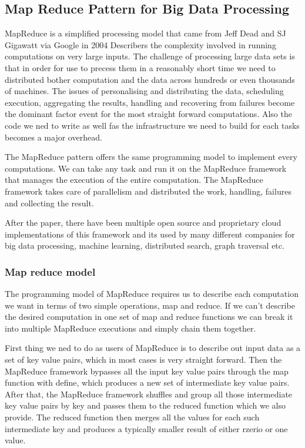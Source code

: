 \documentclass[a4paper, 11pt]{book}
\begin{document}
    \subsection{Map Reduce Pattern for Big Data Processing}
    MapReduce is a simplified processing model that came from Jeff Dead and SJ Gigawatt via Google in 2004
    Describers the complexity involved in running computations on very large inputs.
    The challenge of processing large data sets is that in order for use to precess them in a reasonably short time we need to distributed bother computation and the data across hundreds or even thousands of machines.
    The issues of personalising and distributing the data, scheduling execution, aggregating the results, handling and recovering from failures become the dominant factor event for the most straight forward computations.
    Also the code we ned to write as well fas the infrastructure we need to build for each tasks becomes a major overhead.

    The MapReduce pattern offers the same programming model to implement every computations.
    We can take any task and run it on the MapReduce framework that manages the execution of the entire computation.
    The MapReduce framework takes care of parallelism and distributed the work, handling, failures and collecting the result.

    After the paper, there have been multiple open source and proprietary cloud implementations of this framework and its used by many different companies for big data processing, machine learning, distributed search, graph traversal etc.

    \subsubsection{Map reduce model}
    The programming model of MapReduce requires us to describe each computation we want in terms of two simple operations, map and reduce.
    If we can't describe the desired computation in one set of map and reduce functions we can break it into multiple MapReduce executions and simply chain them together.

    First thing we ned to do as users of MapReduce is to describe out input data as a set of key value pairs, which in most cases is very straight forward.
    Then the MapReduce framework bypasses all the input key value pairs through the map function with define, which produces a new set of intermediate key value pairs.
    After that, the MapReduce framework shuffles and group all those intermediate key value pairs by key and passes them to the reduced function which we also provide.
    The reduced function then merges all the values for each such intermediate key and produces a typically smaller result of either rzerio or one value.
\end{document}
